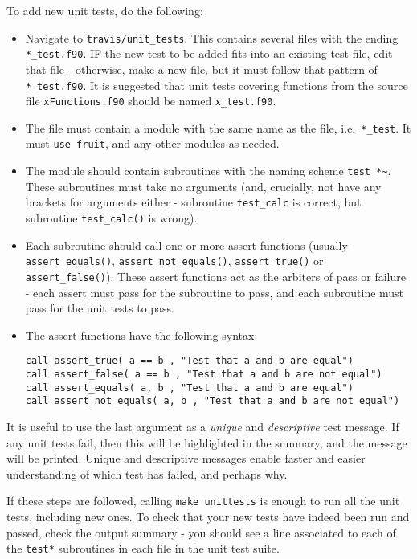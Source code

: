 To add new unit tests, do the following:

\begin{itemize}
\item Navigate to \texttt{travis/unit\_tests}. This contains several
  files with the ending \texttt{*\_test.f90}. IF the new test to be
  added fits into an existing test file, edit that file - otherwise,
  make a new file, but it must follow that pattern of
  \texttt{*\_test.f90}. It is suggested that unit tests covering
  functions from the source file \texttt{xFunctions.f90} should be
  named \texttt{x\_test.f90}.
\item The file must contain a module with the same name as the file,
  i.e.~\texttt{*\_test}. It must \texttt{use\ fruit}, and any other
  modules as needed.
\item The module should contain subroutines with the naming scheme
  \texttt{test\_*\textasciitilde{}}. These subroutines must take no
  arguments (and, crucially, not have any brackets for arguments
  either - subroutine \texttt{test\_calc} is correct, but subroutine
  \texttt{test\_calc()} is wrong).
\item Each subroutine should call one or more assert functions
  (usually \texttt{assert\_equals()}, \texttt{assert\_not\_equals()},
  \texttt{assert\_true()} or \texttt{assert\_false()}).  These assert
  functions act as the arbiters of pass or failure - each assert must
  pass for the subroutine to pass, and each subroutine must pass for
  the unit tests to pass.
  \item The assert functions have the following syntax:

\begin{verbatim}
call assert_true( a == b , "Test that a and b are equal")
call assert_false( a == b , "Test that a and b are not equal")
call assert_equals( a, b , "Test that a and b are equal")
call assert_not_equals( a, b , "Test that a and b are not equal")
\end{verbatim}

\end{itemize}

It is useful to use the last argument as a \emph{unique} and
\emph{descriptive} test message. If any unit tests fail, then this
will be highlighted in the summary, and the message will be
printed. Unique and descriptive messages enable faster and easier
understanding of which test has failed, and perhaps why.

If these steps are followed, calling \texttt{make\ unittests} is
enough to run all the unit tests, including new ones. To check that
your new tests have indeed been run and passed, check the output
summary - you should see a line associated to each of the
\texttt{test*} subroutines in each file in the unit test suite.

